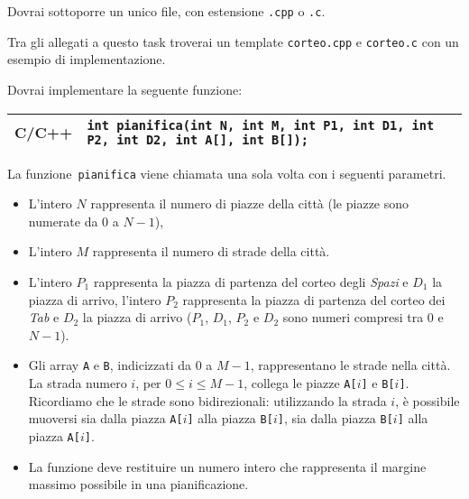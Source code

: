 \pagebreak

\Implementation

Dovrai sottoporre un unico file, con estensione \texttt{.cpp} o \texttt{.c}.

\begin{warning}
Tra gli allegati a questo task troverai un template \texttt{corteo.cpp} e \texttt{corteo.c} con un esempio di implementazione.
\end{warning}

Dovrai implementare la seguente funzione:

\begin{center}\begin{tabularx}{\textwidth}{|c|X|}
\hline
\hspace*{-7pt} C/C++ \hspace*{-7pt}  & \hspace*{-6pt} \verb|int pianifica(int N, int M, int P1, int D1, int P2, int D2, int A[], int B[]);|\\
\hline
\end{tabularx}\end{center}

La funzione~\texttt{pianifica} viene chiamata una sola volta con i seguenti parametri.
\begin{itemize}[nolistsep]
  \item L'intero $N$ rappresenta il numero di piazze della città (le piazze sono numerate da $0$ a $N-1$),
  \item L'intero $M$ rappresenta il numero di strade della città.
  \item L'intero $P_1$ rappresenta la piazza di partenza del corteo degli \emph{Spazi} e $D_1$ la piazza di arrivo,
        l'intero $P_2$ rappresenta la piazza di partenza del corteo dei \emph{Tab} e $D_2$ la piazza di arrivo
        ($P_1$, $D_1$, $P_2$ e $D_2$ sono numeri compresi tra $0$ e $N-1$).
  \item
    Gli array \texttt{A} e \texttt{B}, indicizzati da $0$ a $M-1$, rappresentano le strade nella città.
    La strada numero $i$, per $0 \leq i \leq M-1$, collega le piazze \texttt{A[$i$]} e \texttt{B[$i$]}.
    Ricordiamo che le strade sono bidirezionali: utilizzando la strada $i$,
    è possibile muoversi sia dalla piazza \texttt{A[$i$]} alla piazza \texttt{B[$i$]},
    sia dalla piazza \texttt{B[$i$]} alla piazza \texttt{A[$i$]}.
  \item La funzione deve restituire un numero intero che rappresenta il margine massimo possibile in una pianificazione.
\end{itemize}

